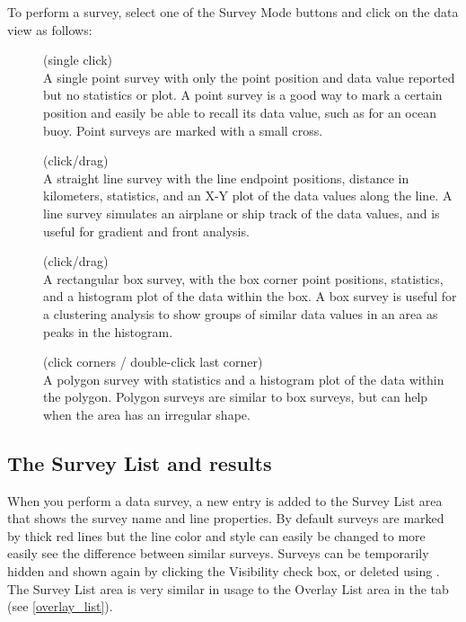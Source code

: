 To perform a survey, select one of the {\gui Survey Mode} buttons
and click on the data view as follows:
\begin{description}

\item[] (single click) \\ A single point
survey with only the point position and data value reported but
no statistics or plot.  A point survey is a good way to mark a
certain position and easily be able to recall its data value,
such as for an ocean buoy.  Point surveys are marked with a small
cross.

\item[] (click/drag) \\
A straight line survey with the line endpoint positions, distance
in kilometers, statistics, and an X-Y plot of the data values
along the line. A line survey simulates an airplane or ship track
of the data values, and is useful for gradient and front
analysis.

\item[] (click/drag) \\ A
rectangular box survey, with the box corner point positions,
statistics, and a histogram plot of the data within the box. A
box survey is useful for a clustering analysis to show groups of
similar data values in an area as peaks in the histogram.

\item[] (click
corners / double-click last corner) \\ A polygon survey with
statistics and a histogram plot of the data within the
polygon. Polygon surveys are similar to box surveys, but can help
when the area has an irregular shape.

\end{description}

\subsection{The {\gui Survey List} and results}

When you perform a data survey, a new entry is added to the
{\gui Survey List} area that shows the survey name and line
properties.  By default surveys are marked by thick red lines but
the line color and style can easily be changed to more easily see
the difference between similar surveys.  Surveys can be
temporarily hidden and shown again by clicking the
{\gui Visibility} check box, or deleted using
.  The {\gui Survey List} area is very
similar in usage to the {\gui Overlay List} area in the
 tab (see \autoref{overlay_list}).

